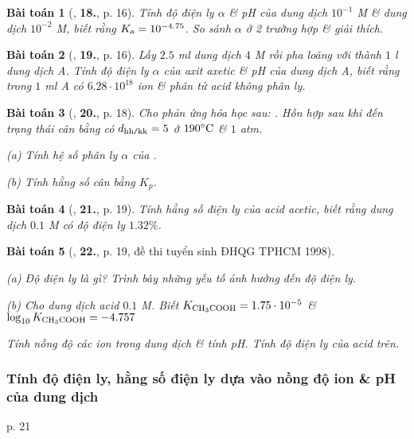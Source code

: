 \documentclass{article}
\numberwithin{equation}{section}
\newtheorem{baitoan}{Bài toán}[section]
\begin{document}
\begin{baitoan}[\cite{An2004}, \textbf{18.}, p. 16]
	Tính độ điện ly $\alpha$ \& pH của dung dịch \emph{} $10^{-1}$ \emph{M} \& dung dịch \emph{} $10^{-2}$ \emph{M}, biết rằng $K_{\rm a} = 10^{-4.75}$. So sánh $\alpha$ ở 2 trường hợp \& giải thích.
\end{baitoan}

\begin{baitoan}[\cite{An2004}, \textbf{19.}, p. 16]
	Lấy $2.5$ \emph{ml} dung dịch \emph{} $4$ \emph{M} rồi pha loãng với \emph{} thành $1$ \emph{l} dung dịch A. Tính độ điện ly $\alpha$ của axit axetic \& pH của dung dịch A, biết rằng trong $1$ \emph{ml} A có $6.28\cdot 10^{18}$ ion \& phân tử acid không phân ly.
\end{baitoan}

\begin{baitoan}[\cite{An2004}, \textbf{20.}, p. 18]
	Cho phản ứng hóa học sau: \emph{}. Hỗn hợp sau khi đến trạng thái cân bằng có $d_{\rm hh\texttt{/}kk} = 5$ ở $190^\circ{\rm C}$ \& $1$ \emph{atm}.
	\begin{enumerate*}
		\item[(a)] Tính hệ số phân ly $\alpha$ của \emph{}.
		\item[(b)] Tính hằng số cân bằng $K_p$.
	\end{enumerate*}
\end{baitoan}

\begin{baitoan}[\cite{An2004}, \textbf{21.}, p. 19]
	Tính hằng số điện ly của acid acetic, biết rằng dung dịch $0.1$ \emph{M} có độ điện ly $1.32\%$.
\end{baitoan}

\begin{baitoan}[\cite{An2004}, \textbf{22.}, p. 19, đề thi tuyển sinh ĐHQG TPHCM 1998]
	\begin{enumerate*}
		\item[(a)] Độ điện ly là gì? Trình bày những yếu tố ảnh hưởng đến độ điện ly.
		\item[(b)] Cho dung dịch acid \emph{} $0.1$ \emph{M}. Biết $K_{\ce{CH3COOH}} = 1.75\cdot 10^{-5}$ \& $\log_{10}K_{\ce{CH3COOH}} = -4.757$
	\end{enumerate*}
	Tính nồng độ các ion trong dung dịch \& tính pH. Tính độ điện ly của acid trên.
\end{baitoan}

\subsubsection{Tính độ điện ly, hằng số điện ly dựa vào nồng độ ion  \& pH của dung dịch}
p. 21
\end{document}
